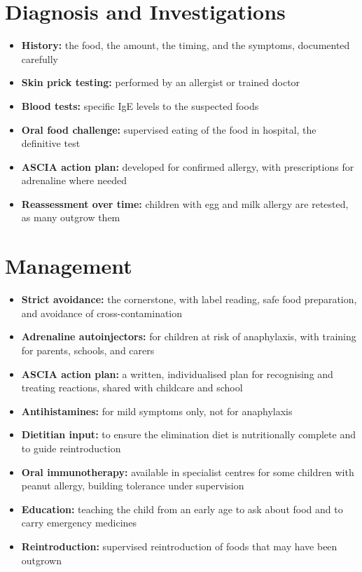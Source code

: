 \section*{Diagnosis and Investigations}
\begin{itemize}
    \item \textbf{History:} the food, the amount, the timing, and the symptoms, documented carefully
    \item \textbf{Skin prick testing:} performed by an allergist or trained doctor
    \item \textbf{Blood tests:} specific IgE levels to the suspected foods
    \item \textbf{Oral food challenge:} supervised eating of the food in hospital, the definitive test
    \item \textbf{ASCIA action plan:} developed for confirmed allergy, with prescriptions for adrenaline where needed
    \item \textbf{Reassessment over time:} children with egg and milk allergy are retested, as many outgrow them
\end{itemize}

\section*{Management}
\begin{itemize}
    \item \textbf{Strict avoidance:} the cornerstone, with label reading, safe food preparation, and avoidance of cross-contamination
    \item \textbf{Adrenaline autoinjectors:} for children at risk of anaphylaxis, with training for parents, schools, and carers
    \item \textbf{ASCIA action plan:} a written, individualised plan for recognising and treating reactions, shared with childcare and school
    \item \textbf{Antihistamines:} for mild symptoms only, not for anaphylaxis
    \item \textbf{Dietitian input:} to ensure the elimination diet is nutritionally complete and to guide reintroduction
    \item \textbf{Oral immunotherapy:} available in specialist centres for some children with peanut allergy, building tolerance under supervision
    \item \textbf{Education:} teaching the child from an early age to ask about food and to carry emergency medicines
    \item \textbf{Reintroduction:} supervised reintroduction of foods that may have been outgrown
\end{itemize}

